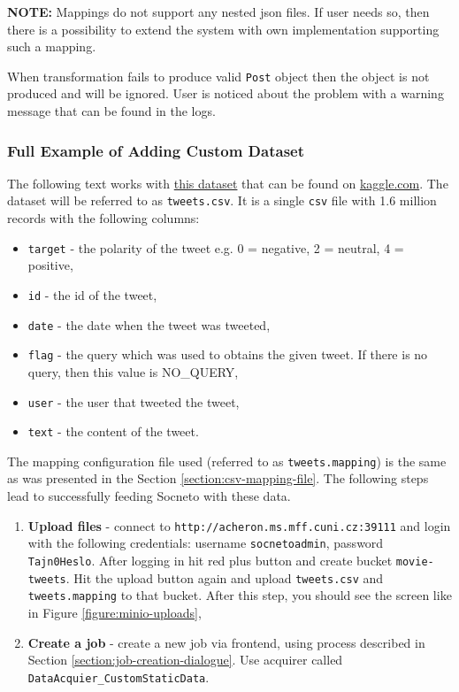 \documentclass{article}
\begin{document}
\textbf{NOTE:} Mappings do not support any nested json files. If user needs so, then there is a possibility to extend the system with own implementation supporting such a mapping.

When transformation fails to produce valid \texttt{Post} object then the object is not produced and will be ignored. User is noticed about the problem with a warning message that can be found in the logs.


\subsubsection{Full Example of Adding Custom Dataset}
The following text works with \href{https://www.kaggle.com/kazanova/sentiment140}{this dataset} that can be found on \href{https://www.kaggle.com}{kaggle.com}. The dataset will be referred to as \texttt{tweets.csv}. It is a single \texttt{csv} file with 1.6 million records with the following columns:

\begin{itemize}
    \item \texttt{target} - the polarity of the tweet e.g. 0 = negative, 2 = neutral, 4 = positive,
    \item \texttt{id} - the id of the tweet,
    \item \texttt{date} - the date when the tweet was tweeted,
    \item \texttt{flag} - the query which was used to obtains the given tweet. If there is no query, then this value is NO\_QUERY,
    \item \texttt{user} - the user that tweeted the tweet,
    \item \texttt{text} - the content of the tweet.
\end{itemize}

The mapping configuration file used (referred to as \texttt{tweets.mapping}) is the same as was presented in the Section \ref{section:csv-mapping-file}. The following steps lead to successfully feeding Socneto with these data.

\begin{enumerate}
    \item \textbf{Upload files} - connect to \texttt{http://acheron.ms.mff.cuni.cz:39111} and login with the following credentials: username \texttt{socnetoadmin}, password \texttt{Tajn0Heslo}. After logging in hit red plus button and create bucket \texttt{movie-tweets}. Hit the upload button again and upload \texttt{tweets.csv} and \texttt{tweets.mapping} to that bucket. After this step, you should see the screen like in Figure \ref{figure:minio-uploads},
    \item \textbf{Create a job} - create a new job via frontend, using process described in Section \ref{section:job-creation-dialogue}. Use acquirer called \texttt{DataAcquier\_CustomStaticData}.
\end{enumerate}
\end{document}
